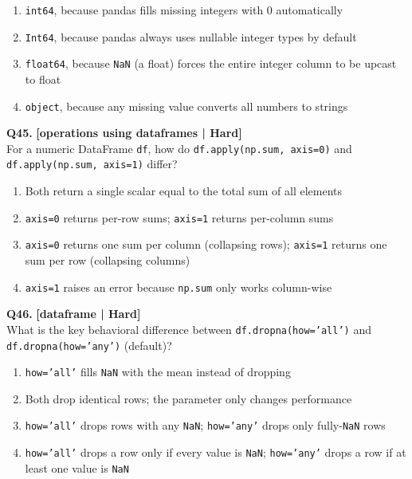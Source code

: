 \begin{enumerate}[label=(\alph*),topsep=2pt,itemsep=1pt,partopsep=0pt,parsep=0pt]
    \item \relax \texttt{int64}, because pandas fills missing integers with 0 automatically
    \item \relax \texttt{Int64}, because pandas always uses nullable integer types by default
    \item \relax \texttt{float64}, because \texttt{NaN} (a float) forces the entire integer column to be upcast to float
    \item \relax \texttt{object}, because any missing value converts all numbers to strings
\end{enumerate}
\vspace{2mm}

\noindent\textbf{Q45.} \hfill {\small\color{LPUOrange}\textbf{[operations using dataframes | Hard]}}\\[2pt]
For a numeric DataFrame \texttt{df}, how do \texttt{df.apply(np.sum, axis=0)} and \texttt{df.apply(np.sum, axis=1)} differ?

\begin{enumerate}[label=(\alph*),topsep=2pt,itemsep=1pt,partopsep=0pt,parsep=0pt]
    \item \relax Both return a single scalar equal to the total sum of all elements
    \item \relax \texttt{axis=0} returns per-row sums; \texttt{axis=1} returns per-column sums
    \item \relax \texttt{axis=0} returns one sum per column (collapsing rows); \texttt{axis=1} returns one sum per row (collapsing columns)
    \item \relax \texttt{axis=1} raises an error because \texttt{np.sum} only works column-wise
\end{enumerate}
\vspace{2mm}

\noindent\textbf{Q46.} \hfill {\small\color{LPUOrange}\textbf{[dataframe | Hard]}}\\[2pt]
What is the key behavioral difference between \texttt{df.dropna(how='all')} and \texttt{df.dropna(how='any')} (default)?

\begin{enumerate}[label=(\alph*),topsep=2pt,itemsep=1pt,partopsep=0pt,parsep=0pt]
    \item \relax \texttt{how='all'} fills \texttt{NaN} with the mean instead of dropping
    \item \relax Both drop identical rows; the parameter only changes performance
    \item \relax \texttt{how='all'} drops rows with any \texttt{NaN}; \texttt{how='any'} drops only fully-\texttt{NaN} rows
    \item \relax \texttt{how='all'} drops a row only if every value is \texttt{NaN}; \texttt{how='any'} drops a row if at least one value is \texttt{NaN}
\end{enumerate}
\vspace{2mm}

